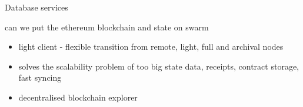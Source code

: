 \documentclass{beamer}
\begin{document}
\begin{section}{Database services}

\begin{frame}
\begin{block}{can we put the ethereum blockchain and state on swarm}
\begin{itemize}
 \item light client - flexible transition from remote, light, full and archival nodes
 \item solves the scalability problem of too big state data, receipts, contract storage, fast syncing
 \item decentralised blockchain explorer
\end{itemize}
\end{block}
\end{frame}



\end{section}
\end{document}
